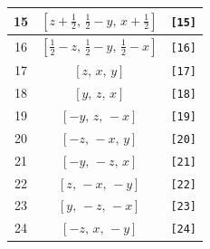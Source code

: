 \documentclass[fleqn,8pt]{jsarticle}
\begin{document}
\begin{longtable}{ccc}
15 & $\left[ z + \frac{1}{2},\, \frac{1}{2} - y,\, x + \frac{1}{2} \right]$ & {\tt [15]} \\ \hline
16 & $\left[ \frac{1}{2} - z,\, \frac{1}{2} - y,\, \frac{1}{2} - x \right]$ & {\tt [16]} \\ \hline
17 & $\left[ z,\, x,\, y \right]$ & {\tt [17]} \\ \hline
18 & $\left[ y,\, z,\, x \right]$ & {\tt [18]} \\ \hline
19 & $\left[ - y,\, z,\, - x \right]$ & {\tt [19]} \\ \hline
20 & $\left[ - z,\, - x,\, y \right]$ & {\tt [20]} \\ \hline
21 & $\left[ - y,\, - z,\, x \right]$ & {\tt [21]} \\ \hline
22 & $\left[ z,\, - x,\, - y \right]$ & {\tt [22]} \\ \hline
23 & $\left[ y,\, - z,\, - x \right]$ & {\tt [23]} \\ \hline
24 & $\left[ - z,\, x,\, - y \right]$ & {\tt [24]} \\
\end{longtable}
\end{document}
